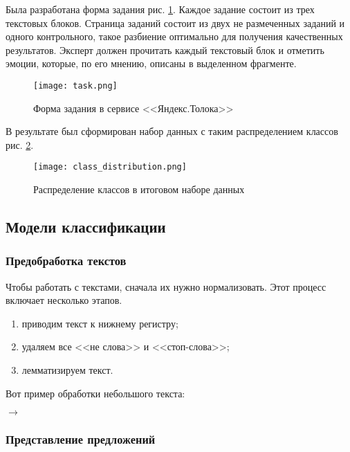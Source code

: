 \bigskip
Была разработана форма задания рис. \ref{fig:task}. Каждое задание состоит из трех текстовых блоков. Страница заданий состоит из двух не размеченных заданий и одного контрольного, такое разбиение оптимально для получения качественных результатов. Эксперт должен прочитать каждый текстовый блок и отметить эмоции, которые, по его мнению, описаны в выделенном фрагменте.

\begin{figure}[ht]
    \centering
    \texttt{[image: task.png]}
    \caption{Форма задания в сервисе <<Яндекс.Толока>>}
    \label{fig:task}
\end{figure}

\bigskip
В результате был сформирован набор данных с таким распределением классов рис. \ref{fig:class_distribution}.



\begin{figure}[ht]
    \centering
    \texttt{[image: class\_distribution.png]}
    \caption{Распределение классов в итоговом наборе данных}
    \label{fig:class_distribution}
\end{figure}

\subsection{Модели классификации}

\subsubsection{Предобработка текстов}

Чтобы работать с текстами, сначала их нужно нормализовать. Этот процесс включает несколько этапов.

\bigskip
\begin{enumerate}
 \item приводим текст к нижнему регистру;
 \item удаляем все <<не слова>> и <<стоп-слова>>;
 \item лемматизируем текст.
\end{enumerate}

\bigskip
Вот пример обработки небольшого текста:

\bigskip
{} $\to$ 


\subsubsection{Представление предложений}


